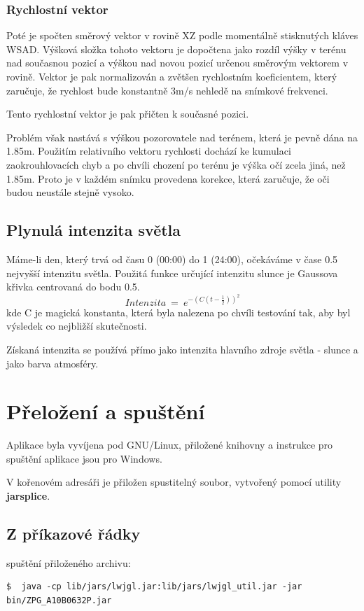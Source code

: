 \documentclass[11pt]{article}
\begin{document}
\subsubsection{Rychlostní vektor}
Poté je spočten směrový vektor v rovině XZ podle momentálně stisknutých
kláves WSAD. Výšková složka tohoto vektoru je dopočtena jako rozdíl výšky v
terénu nad současnou pozicí a výškou nad novou pozicí určenou směrovým vektorem
v rovině. Vektor je pak normalizován a zvětšen rychlostním koeficientem, který
zaručuje, že rychlost bude konstantně 3m/s nehledě na snímkové frekvenci.

Tento rychlostní vektor je pak přičten k současné pozici.

Problém však nastává s výškou pozorovatele nad terénem, která je pevně dána na
1.85m. Použitím relativního vektoru rychlosti dochází ke kumulaci
zaokrouhlovacích chyb a po chvíli chození po terénu je výška očí zcela jiná,
než 1.85m. Proto je v každém snímku provedena korekce, která zaručuje, že oči
budou neustále stejně vysoko.

\subsection{Plynulá intenzita světla}
Máme-li den, který trvá od času 0 (00:00) do 1 (24:00), očekáváme v čase 0.5
nejvyšší intenzitu světla. Použitá funkce určující intenzitu slunce je Gaussova
křivka centrovaná do bodu 0.5.
$$
Intenzita~=~e^{- (C(t - \frac{1}{2}))^2}
$$
kde C je magická konstanta, která byla nalezena po chvíli testování tak, aby
byl výsledek co nejbližší skutečnosti.

Získaná intenzita se používá přímo jako intenzita hlavního zdroje světla - slunce a jako barva atmosféry.

\section{Přeložení a spuštění}
Aplikace byla vyvíjena pod GNU/Linux, přiložené knihovny a instrukce pro spuštění aplikace jsou pro Windows.

V kořenovém adresáři je přiložen spustitelný soubor, vytvořený pomocí utility \textbf {jarsplice}.

\subsection{Z příkazové řádky}
spuštění přiloženého archivu:
\begin{verbatim}
$  java -cp lib/jars/lwjgl.jar:lib/jars/lwjgl_util.jar -jar
bin/ZPG_A10B0632P.jar
\end{verbatim}
\end{document}
